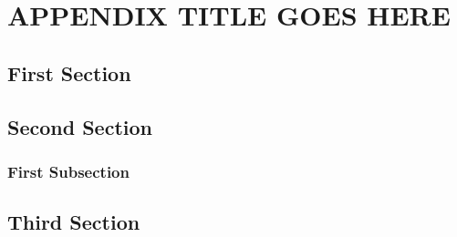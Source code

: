 \chapter{APPENDIX TITLE GOES HERE}
\label{appendix}

\section{First Section}


\section{Second Section}


\subsection{First Subsection}


\section{Third Section}
